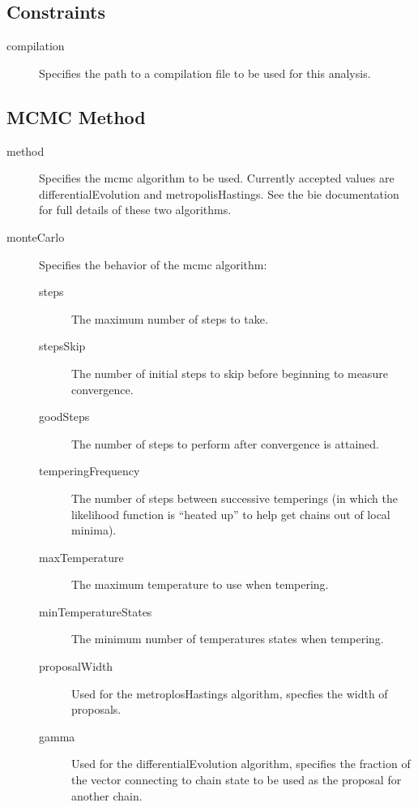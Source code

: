 \subsection{Constraints}

\begin{description}
\item[{\normalfont \ttfamily compilation}] Specifies the path to a compilation file to be used for this analysis.
\end{description}

\subsection{MCMC Method}

\begin{description}
\item[{\normalfont \ttfamily method}] Specifies the \gls{mcmc} algorithm to be used. Currently accepted values are {\normalfont \ttfamily differentialEvolution} and {\normalfont \ttfamily metropolisHastings}. See the \gls{bie} documentation for full details of these two algorithms.
\item[{\normalfont \ttfamily monteCarlo}] Specifies the behavior of the \gls{mcmc} algorithm:
\begin{description}
\item[{\normalfont \ttfamily steps}] The maximum number of steps to take.
\item[{\normalfont \ttfamily stepsSkip}] The number of initial steps to skip before beginning to measure convergence.
\item[{\normalfont \ttfamily goodSteps}] The number of steps to perform after convergence is attained.
\item[{\normalfont \ttfamily temperingFrequency}] The number of steps between successive temperings (in which the likelihood function is ``heated up'' to help get chains out of local minima).
\item[{\normalfont \ttfamily maxTemperature}] The maximum temperature to use when tempering.
\item [{\normalfont \ttfamily minTemperatureStates}] The minimum number of temperatures states when tempering.
\item[{\normalfont \ttfamily proposalWidth}] Used for the {\normalfont \ttfamily metroplosHastings} algorithm, specfies the width of proposals.
\item[{\normalfont \ttfamily gamma}] Used for the {\normalfont \ttfamily differentialEvolution} algorithm, specifies the fraction of the vector connecting to chain state to be used as the proposal for another chain.

\end{description}
\end{description}
